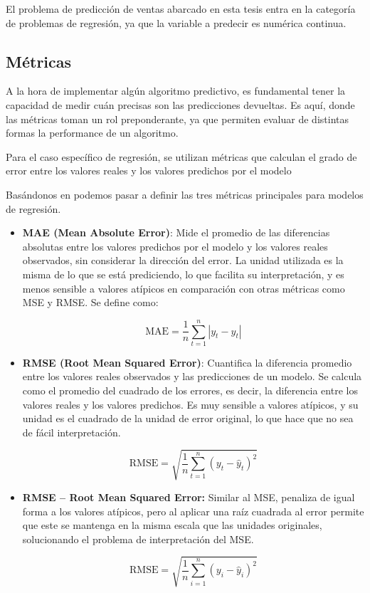 El problema de predicción de ventas abarcado en esta tesis entra en la categoría de problemas de regresión, ya que la variable a predecir es numérica continua.

\subsection{Métricas}

A la hora de implementar algún algoritmo predictivo, es fundamental tener la capacidad de medir cuán precisas son las predicciones devueltas. Es aquí, donde las métricas toman un rol preponderante, ya que permiten evaluar de distintas formas la performance de un algoritmo.

Para el caso específico de regresión, se utilizan métricas que calculan el grado de error entre los valores reales y los valores predichos por el modelo

Basándonos en \parencite{hyndman2018forecasting, james2013isl} podemos pasar a definir las tres métricas principales para modelos de regresión.

\begin{itemize}
    \item \textbf{MAE (Mean Absolute Error)}: Mide el promedio de las diferencias absolutas entre los valores predichos por el modelo y los valores reales observados, sin considerar la dirección del error. La unidad utilizada es la misma de lo que se está prediciendo, lo que facilita su interpretación, y es menos sensible a valores atípicos en comparación con otras métricas como MSE y RMSE. Se define como:

    \[
        \mbox{MAE} = \frac{1}{n} \sum_{t=1}^{n} \left| y_t - \hat{y}_t \right|
    \]

    \item \textbf{RMSE (Root Mean Squared Error)}: Cuantifica la diferencia promedio entre los valores reales observados y las predicciones de un modelo. Se calcula como el promedio del cuadrado de los errores, es decir, la diferencia entre los valores reales y los valores predichos. Es muy sensible a valores atípicos, y su unidad es el cuadrado de la unidad de error original, lo que hace que no sea de fácil interpretación.
    
    \[
        \mbox{RMSE} = \sqrt{ \frac{1}{n} \sum_{t=1}^{n} \left( y_t - \hat{y}_t \right)^2 }
    \]

    \item \textbf{RMSE – Root Mean Squared Error:} Similar al MSE, penaliza de igual forma a los valores atípicos, pero al aplicar una raíz cuadrada al error permite que este se mantenga en la misma escala que las unidades originales, solucionando el problema de interpretación del MSE.

    \[
        \mbox{RMSE} = \sqrt{ \frac{1}{n} \sum_{i=1}^{n} (y_i - \hat{y}_i)^2 }
    \]
\end{itemize}

